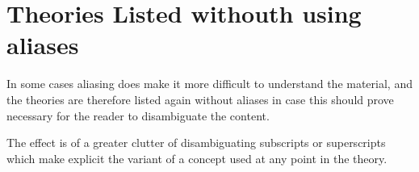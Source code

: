 {
\let\Section\subsection
\let\Subsection\subsubsection
\def\subsection#1{\Subsection*{#1}}

\def\section#1{\Section{#1}\label{t045}}

\def\section#1{\Section{#1}\label{t045q}}

\def\section#1{\Section{#1}\label{t045k}}

\def\section#1{\Section{#1}\label{t045w}}

}  %

\section{Theories Listed withouth using aliases}\label{TheoryListingsWithoutAliases}

In some cases aliasing does make it more difficult to understand the material, and the theories are therefore listed again without aliases in case this should prove necessary for the reader to disambiguate the content.

The effect is of a greater clutter of disambiguating subscripts or superscripts which make explicit the variant of a concept used at any point in the theory.

